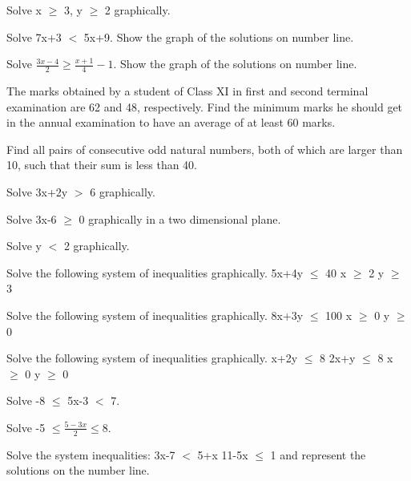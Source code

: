 
\item Solve  x $\geq$ 3, y $\geq$ 2 graphically.
\\
\solution 


    \item Solve 7x+3 $<$ 5x+9. Show the graph of the solutions on number line.
\\
\solution 

    \item Solve $\frac{3x-4}{2} \geq \frac{x+1}{4}-1$. Show the graph of the solutions on number line.
\\
\solution 

    \item The marks obtained by a student of Class XI in first and second terminal examination are 62 and 48, respectively. Find the minimum marks he should get in the annual examination to have an average of at least 60 marks.
\\
\solution 

    \item Find all pairs of consecutive odd natural numbers, both of which are larger than 10, such that their sum is less than 40.
\\
\solution 

    \item Solve 3x+2y $>$ 6 graphically.
\\
\solution 

    \item Solve 3x-6 $\geq$ 0 graphically in a two dimensional plane.
\\
\solution 
    
\item Solve y $<$ 2 graphically.
    \item Solve the following system of inequalities graphically.
     5x+4y $\leq$ 40
     x $\geq$ 2
     y $\geq$ 3
     \item Solve the following system of inequalities graphically.
     8x+3y $\leq$ 100
     x $\geq$ 0
     y $\geq$ 0
     \item Solve the following system of inequalities graphically.
     x+2y $\leq$ 8
     2x+y $\leq$ 8
     x $\geq$ 0
     y $\geq$ 0
     \item Solve -8 $\leq$ 5x-3 $<$ 7.
     \item Solve -5 $\leq \frac{5-3x}{2} \leq 8$.
     \item Solve the system inequalities:
     3x-7 $<$ 5+x
     11-5x $\leq$ 1
     and represent the solutions on the number line.
    
